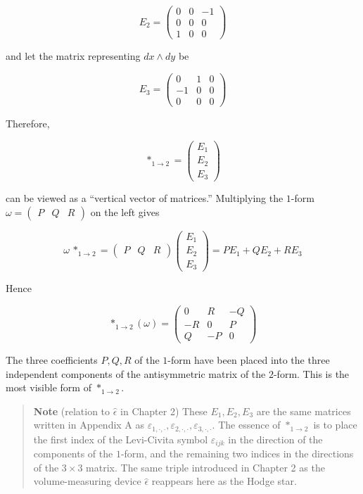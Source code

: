 \documentclass[a4paper,12pt,openany]{book}
\begin{document}
\[
E_2 =
\begin{pmatrix}
0 & 0 & -1 \\
0 & 0 & 0 \\
1 & 0 & 0
\end{pmatrix}
\]

and let the matrix representing \(dx\wedge dy\) be

\[
E_3 =
\begin{pmatrix}
0 & 1 & 0 \\
-1 & 0 & 0 \\
0 & 0 & 0
\end{pmatrix}
\]

Therefore,

\[
\ast_{1\to2}
=
\begin{pmatrix}
E_1\\
E_2\\
E_3
\end{pmatrix}
\]

can be viewed as a ``vertical vector of matrices.'' Multiplying the
\(1\)-form \(\omega=\begin{pmatrix}P&Q&R\end{pmatrix}\) on the left
gives

\[
\omega\,\ast_{1\to2}
=
\begin{pmatrix}P&Q&R\end{pmatrix}
\begin{pmatrix}
E_1\\
E_2\\
E_3
\end{pmatrix}
=
P E_1+Q E_2+R E_3
\]

Hence

\[
\ast_{1\to2}(\omega)
=
\begin{pmatrix}
0 & R & -Q \\
-R & 0 & P \\
Q & -P & 0
\end{pmatrix}
\]

The three coefficients \(P,Q,R\) of the \(1\)-form have been placed into
the three independent components of the antisymmetric matrix of the
\(2\)-form. This is the most visible form of \(\ast_{1\to2}\).

\begin{quote}
\textbf{Note} (relation to \(\widehat{\epsilon}\) in Chapter 2) These
\(E_1,E_2,E_3\) are the same matrices written in Appendix A as
\(\varepsilon_{1,\cdot,\cdot},\varepsilon_{2,\cdot,\cdot},\varepsilon_{3,\cdot,\cdot}\).
The essence of \(\ast_{1\to2}\) is to place the first index of the
Levi-Civita symbol \(\varepsilon_{ijk}\) in the direction of the
components of the \(1\)-form, and the remaining two indices in the
directions of the \(3\times3\) matrix. The same triple introduced in
Chapter 2 as the volume-measuring device \(\widehat{\epsilon}\)
reappears here as the Hodge star.
\end{quote}
\end{document}
